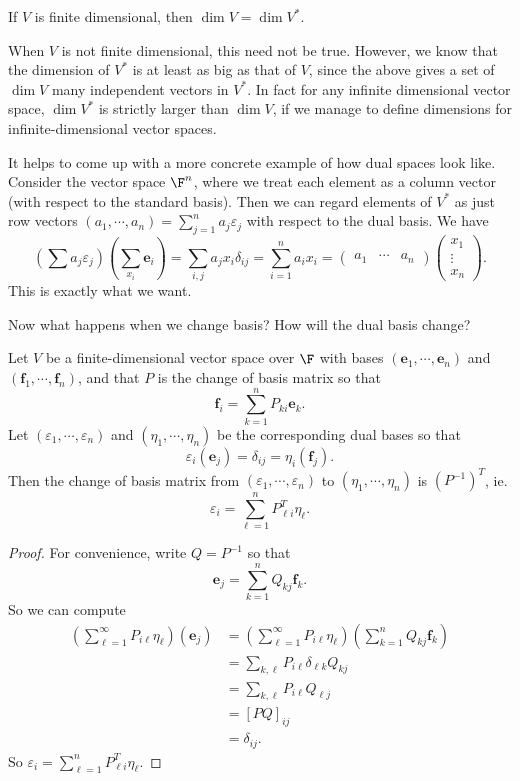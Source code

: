 \documentclass[a4paper]{article}
\begin{document}
\begin{cor}
  If $V$ is finite dimensional, then $\dim V = \dim V^*$.
\end{cor}
When $V$ is not finite dimensional, this need not be true. However, we know that the dimension of $V^*$ is at least as big as that of $V$, since the above gives a set of $\dim V$ many independent vectors in $V^*$. In fact for any infinite dimensional vector space, $\dim V^*$ is strictly larger than $\dim V$, if we manage to define dimensions for infinite-dimensional vector spaces.

It helps to come up with a more concrete example of how dual spaces look like. Consider the vector space $\F^n$, where we treat each element as a column vector (with respect to the standard basis). Then we can regard elements of $V^*$ as just row vectors $(a_1, \cdots, a_n) = \sum_{j = 1}^n a_j\varepsilon_j$ with respect to the dual basis. We have
\[
  \left(\sum a_j \varepsilon_j\right)\left(\sum_{x_i}\mathbf{e}_i\right) = \sum_{i, j} a_j x_i \delta_{ij} = \sum_{i = 1}^n a_i x_i =
  \begin{pmatrix}
    a_1 & \cdots & a_n
  \end{pmatrix}
  \begin{pmatrix}
    x_1\\\vdots\\x_n
  \end{pmatrix}.
\]
This is exactly what we want.

Now what happens when we change basis? How will the dual basis change?
\begin{prop}
  Let $V$ be a finite-dimensional vector space over $\F$ with bases $(\mathbf{e}_1, \cdots, \mathbf{e}_n)$ and $(\mathbf{f}_1, \cdots, \mathbf{f}_n)$, and that $P$ is the change of basis matrix so that
  \[
    \mathbf{f}_i = \sum_{k = 1}^n P_{ki}\mathbf{e}_k.
  \]
  Let $(\varepsilon_1, \cdots, \varepsilon_n)$ and $(\eta_1, \cdots, \eta_n)$ be the corresponding dual bases so that
  \[
    \varepsilon_i (\mathbf{e}_j) = \delta_{ij} = \eta_i (\mathbf{f}_j).
  \]
  Then the change of basis matrix from $(\varepsilon_1, \cdots, \varepsilon_n)$ to $(\eta_1, \cdots, \eta_n)$ is $(P^{-1})^T$, ie.
  \[
    \varepsilon_i = \sum_{\ell = 1}^n P_{\ell i}^T \eta_\ell.
  \]
\end{prop}

\begin{proof}
  For convenience, write $Q = P^{-1}$ so that
  \[
    \mathbf{e}_j = \sum_{k = 1}^n Q_{kj}\mathbf{f}_k.
  \]
  So we can compute
  \begin{align*}
    \left(\sum_{\ell = 1}^\infty P_{i\ell}\eta_\ell\right)(\mathbf{e}_j) &= \left(\sum_{\ell = 1}^\infty P_{i\ell}\eta_\ell\right)\left(\sum_{k = 1}^n Q_{kj}\mathbf{f}_k\right)\\
    &= \sum_{k, \ell} P_{i\ell}\delta_{\ell k} Q_{kj}\\
    &= \sum_{k, \ell} P_{i\ell} Q_{\ell j}\\
    &= [PQ]_{ij}\\
    &= \delta_{ij}.
  \end{align*}
  So $\varepsilon_i = \sum_{\ell = 1}^n P_{\ell i}^T \eta_\ell$.
\end{proof}
\end{document}
